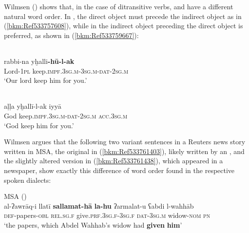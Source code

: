 \documentclass[output=paper]{langsci/langscibook}
\begin{document}
Wilmsen (\citeyear[104]{Wilmsen2010}) shows that, in the case of ditransitive verbs,  and  have a different natural {word order}. In  , the direct object must precede the indirect object as in (\ref{bkm:Ref533757608}), while in   the indirect object preceding the direct object is preferred, as shown in (\ref{bkm:Ref533759667}):

\ea
\label{bkm:Ref533757608}\\
\gll rabbi-na yḫalli\textbf{{}-hū-l-ak}\\
     Lord-\textsc{1pl} keep\textsc{.impf.3sg.m}{}-3\textsc{sg.m-dat-2sg.m}\\
\glt ‘Our lord keep him for you.’
\z

\ea\label{bkm:Ref533759667}\\
\gll aḷḷa yḫallī-l-ak iyyā\\
     God keep\textsc{.impf.3sg.m-dat-2sg.m} \textsc{acc.}3\textsc{sg.m} \\
\glt ‘God keep him for you.’\z

Wilmsen argues that the following two variant sentences in a Reuters news story written in MSA, the original in (\ref{bkm:Ref533761403}), likely written by an , and the slightly altered version in (\ref{bkm:Ref533761438}), which appeared in a  newspaper, show exactly this difference of {word order} found in the respective spoken dialects:

\ea
\label{bkm:Ref533761403}MSA ()\\
\gll al-ʔawrāq-i llatī \textbf{sallamat-hā} \textbf{la-hu} ʔarmalat-u ʕabdi l-wahhāb\\
     \textsc{def}{}-papers-\textsc{obl} \textsc{rel.sg.f} give.\textsc{prf.3sg.f-3sg.f} \textsc{dat-3sg.m} widow-\textsc{nom} \textsc{pn}\\
     \glt ‘the papers, which Abdel Wahhab’s widow had \textbf{given} \textbf{him}’
\z

\end{document}
